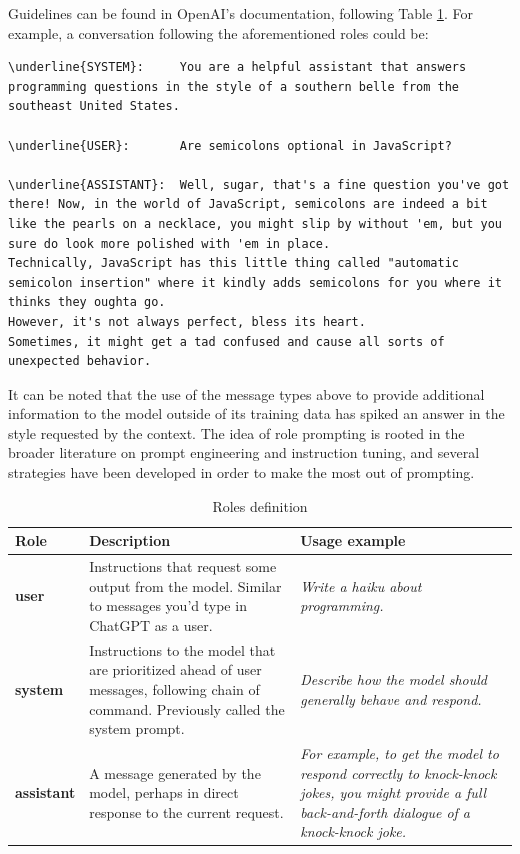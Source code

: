 Guidelines can be found in OpenAI's documentation, following Table \ref{tab:roles}. For example, a conversation following the aforementioned roles could be:

\begin{Verbatim}[breaklines=true]
\underline{SYSTEM}:     You are a helpful assistant that answers programming questions in the style of a southern belle from the southeast United States.

\underline{USER}:       Are semicolons optional in JavaScript?

\underline{ASSISTANT}:  Well, sugar, that's a fine question you've got there! Now, in the world of JavaScript, semicolons are indeed a bit like the pearls on a necklace, you might slip by without 'em, but you sure do look more polished with 'em in place.
Technically, JavaScript has this little thing called "automatic semicolon insertion" where it kindly adds semicolons for you where it thinks they oughta go.
However, it's not always perfect, bless its heart.
Sometimes, it might get a tad confused and cause all sorts of unexpected behavior.
\end{Verbatim}

It can be noted that the use of the message types above to provide additional information to the model outside of its training data has spiked an answer in the style requested by the context.
The idea of role prompting is rooted in the broader literature on prompt engineering and instruction tuning, and several strategies have been developed in order to make the most out of prompting. \cite{openai2025textgeneration}

\begin{table}[hb]
    \centering
    \renewcommand{\arraystretch}{1.3}
    \begin{tabularx}{\textwidth}{|X|X|X|}
        \hline
        \textbf{Role} & \textbf{Description} & \textbf{Usage example} \\
        \hline
        \textbf{user} &
        Instructions that request some output from the model. Similar to messages you'd type in ChatGPT as a user. &
        \textit{Write a haiku about programming.} \\
        \hline
        \textbf{system} &
        Instructions to the model that are prioritized ahead of user messages, following chain of command. Previously called the system prompt. &
        \textit{Describe how the model should generally behave and respond.} \\
        \hline
        \textbf{assistant} &
        A message generated by the model, perhaps in direct response to the current request. &
        \textit{For example, to get the model to respond correctly to knock-knock jokes, you might provide a full back-and-forth dialogue of a knock-knock joke.} \\
        \hline
    \end{tabularx}
    \caption{Roles definition}
    \label{tab:roles}
\end{table}




